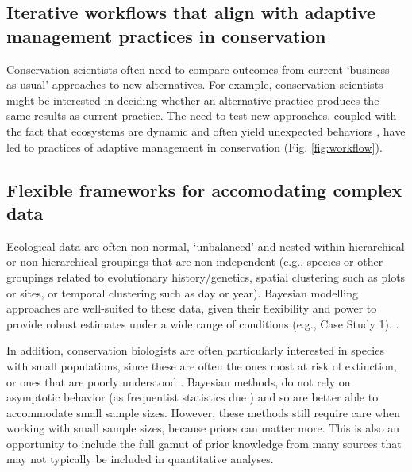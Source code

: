 \documentclass{article}
\begin{document}
\subsection*{Iterative workflows that align with adaptive management practices in conservation}

\par Conservation scientists often need to compare outcomes from current `business-as-usual' approaches to new alternatives. For example, conservation scientists might be interested in deciding whether an alternative practice produces the same results as current practice. 
The need to test new approaches, coupled with the fact that ecosystems are dynamic and often yield unexpected behaviors \citep{Levin2012,Gross2013}, have led to practices of adaptive management in conservation \citep{holling1978adaptive} (Fig. \ref{fig:workflow}). 

\subsection*{Flexible frameworks for accomodating complex data}
\par Ecological data are often non-normal, `unbalanced' and nested within hierarchical or non-hierarchical groupings that are non-independent (e.g., species or other groupings related to evolutionary history/genetics, spatial clustering such as plots or sites, or temporal clustering such as day or year). Bayesian modelling approaches are well-suited to these data, given their flexibility and power to provide robust estimates under a wide range of conditions (e.g., Case Study 1). . %
\par In addition, conservation biologists are often particularly interested in species with small populations, since these are often the ones most at risk of extinction, or ones that are poorly understood \citep{stinchcombe2002influence}. Bayesian methods,  do not rely on asymptotic behavior (as frequentist statistics due \citep{mcneish2016using}) and so are better able to accommodate small sample sizes. However, these methods still require care when working with small sample sizes, because priors can matter more. This is also an opportunity to include the full gamut of prior knowledge from many sources that may not typically be included in quantitative analyses. %
\end{document}
